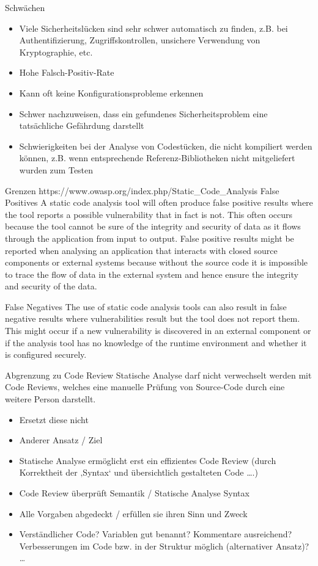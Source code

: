 Schwächen
\begin{itemize}
\item Viele Sicherheitslücken sind sehr schwer automatisch zu finden, z.B. bei Authentifizierung, Zugriffskontrollen, unsichere Verwendung von Kryptographie, etc.
\item Hohe Falsch-Positiv-Rate
\item Kann oft keine Konfigurationsprobleme erkennen 
\item Schwer nachzuweisen, dass ein gefundenes Sicherheitsproblem eine tatsächliche Gefährdung darstellt
\item Schwierigkeiten bei der Analyse von Codestücken, die nicht kompiliert werden können, z.B. wenn entsprechende Referenz-Bibliotheken nicht mitgeliefert wurden zum Testen
\end{itemize}

Grenzen https://www.owasp.org/index.php/Static_Code_Analysis
False Positives
A static code analysis tool will often produce false positive results where the tool reports a possible vulnerability that in fact is not. This often occurs because the tool cannot be sure of the integrity and security of data as it flows through the application from input to output.
False positive results might be reported when analysing an application that interacts with closed source components or external systems because without the source code it is impossible to trace the flow of data in the external system and hence ensure the integrity and security of the data.

False Negatives
The use of static code analysis tools can also result in false negative results where vulnerabilities result but the tool does not report them. This might occur if a new vulnerability is discovered in an external component or if the analysis tool has no knowledge of the runtime environment and whether it is configured securely.

Abgrenzung zu Code Review
Statische Analyse darf nicht verwechselt werden mit Code Reviews, welches eine manuelle Prüfung von Source-Code durch eine weitere Person darstellt.
\begin{itemize}
\item Ersetzt diese nicht
\item Anderer Ansatz / Ziel
\item Statische Analyse ermöglicht erst ein effizientes Code Review (durch Korrektheit der ‚Syntax‘ und übersichtlich gestalteten Code ….)
\item Code Review überprüft Semantik / Statische Analyse Syntax
\item Alle Vorgaben abgedeckt / erfüllen sie ihren Sinn und Zweck
\item Verständlicher Code? Variablen gut benannt? Kommentare ausreichend? Verbesserungen im Code bzw. in der Struktur möglich (alternativer Ansatz)? …
\end{itemize}






